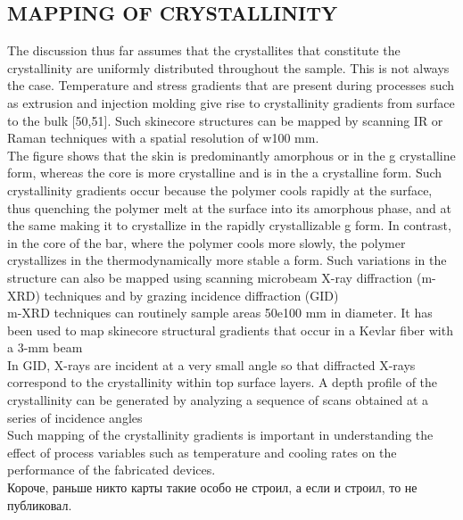 \subsection{MAPPING OF CRYSTALLINITY}
The discussion thus far assumes that the crystallites that constitute the crystallinity are
uniformly distributed throughout the sample. This is not always the case. Temperature
and stress gradients that are present during processes such as extrusion and injection
molding give rise to crystallinity gradients from surface to the bulk [50,51]. Such
skinecore structures can be mapped by scanning IR or Raman techniques with a
spatial resolution of w100 mm.\\
The figure shows that the skin is predominantly amorphous or in the g crystalline
form, whereas the core is more crystalline and is in the a crystalline form. Such crystallinity
gradients occur because the polymer cools rapidly at the surface, thus quenching
the polymer melt at the surface into its amorphous phase, and at the same making it
to crystallize in the rapidly crystallizable g form. In contrast, in the core of the bar,
where the polymer cools more slowly, the polymer crystallizes in the thermodynamically
more stable a form. Such variations in the structure can also be mapped using
scanning microbeam X-ray diffraction (m-XRD) techniques and by grazing incidence
diffraction (GID)\\
m-XRD techniques can routinely sample areas 50e100 mm
in diameter. It has been used to map skinecore structural gradients that occur in a
Kevlar fiber with a 3-mm beam
\\
In GID, X-rays are incident at a very small angle
so that diffracted X-rays correspond to the crystallinity within top surface layers. A
depth profile of the crystallinity can be generated by analyzing a sequence of scans
obtained at a series of incidence angles\\
Such mapping of the crystallinity gradients
is important in understanding the effect of process variables such as temperature
and cooling rates on the performance of the fabricated devices.\\
Короче, раньше никто карты такие особо не строил, а если и строил, то не публиковал.
